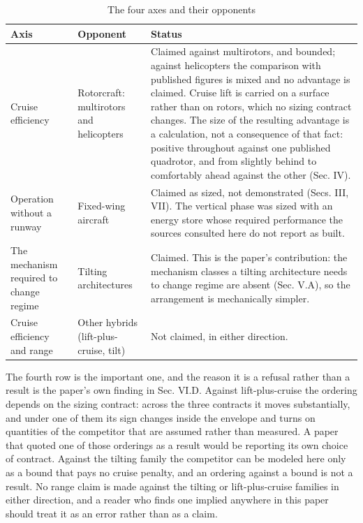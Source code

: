 \documentclass[journal]{new-aiaa}
\begin{document}
\begin{table}[htbp]
\centering
\caption{The four axes and their opponents}
\label{tab:6}
\small
\begin{tabularx}{\linewidth}{XXX}
\hline
Axis & Opponent & Status \\ \hline
Cruise efficiency & Rotorcraft: multirotors and helicopters & Claimed against multirotors, and bounded; against helicopters the comparison with published figures is mixed and no advantage is claimed. Cruise lift is carried on a surface rather than on rotors, which no sizing contract changes. The size of the resulting advantage is a calculation, not a consequence of that fact: positive throughout against one published quadrotor, and from slightly behind to comfortably ahead against the other (Sec. IV). \\
Operation without a runway & Fixed-wing aircraft & Claimed as sized, not demonstrated (Secs. III, VII). The vertical phase was sized with an energy store whose required performance the sources consulted here do not report as built. \\
The mechanism required to change regime & Tilting architectures & Claimed. This is the paper's contribution: the mechanism classes a tilting architecture needs to change regime are absent (Sec. V.A), so the arrangement is mechanically simpler. \\
Cruise efficiency and range & Other hybrids (lift-plus-cruise, tilt) & Not claimed, in either direction. \\
\hline
\end{tabularx}
\end{table}

The fourth row is the important one, and the reason it is a refusal rather than a result is the paper's own finding in Sec. VI.D. Against lift-plus-cruise the ordering depends on the sizing contract: across the three contracts it moves substantially, and under one of them its sign changes inside the envelope and turns on quantities of the competitor that are assumed rather than measured. A paper that quoted one of those orderings as a result would be reporting its own choice of contract. Against the tilting family the competitor can be modeled here only as a bound that pays no cruise penalty, and an ordering against a bound is not a result. No range claim is made against the tilting or lift-plus-cruise families in either direction, and a reader who finds one implied anywhere in this paper should treat it as an error rather than as a claim.
\end{document}
